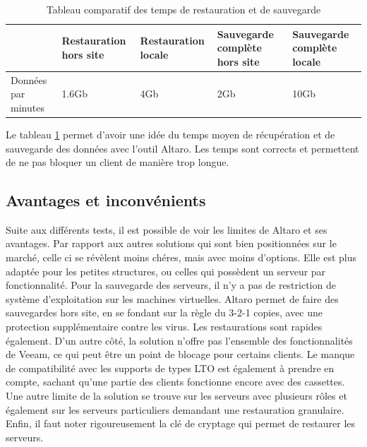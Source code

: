 \documentclass[pfe]{tnreport} %
\begin{document}
\begin{table}[!h]
 \centering
 \begin{tabular}{|p{4cm}|p{2.5cm}|p{2.5cm}|p{2.5cm}|p{2.5cm}|}
 \hline & Restauration hors site & Restauration locale & Sauvegarde complète hors site & Sauvegarde complète locale\\
 \hline Données par minutes & 1.6Gb & 4Gb & 2Gb & 10Gb \\
 \hline 
 \end{tabular}
 \caption{Tableau comparatif des temps de restauration et de sauvegarde}
 \label{tab:temps}
\end{table}
Le tableau \ref{tab:temps} permet d'avoir une idée du temps moyen de récupération et de sauvegarde des données avec l'outil Altaro. Les temps sont corrects et permettent de ne pas bloquer un client de manière trop longue. \newline

\subsection{Avantages et inconvénients}

Suite aux différents tests, il est possible de voir les limites de Altaro et ses avantages.
Par rapport aux autres solutions qui sont bien positionnées sur le marché, celle ci se révèlent moins chéres, mais avec moins d'options. \newline
Elle est plus adaptée pour les petites structures, ou celles qui possèdent un serveur par fonctionnalité. Pour la sauvegarde des serveurs, il n'y a pas de restriction de système d'exploitation sur les machines virtuelles.
Altaro permet de faire des sauvegardes hors site, en se fondant sur la règle du 3-2-1 copies, avec une protection supplémentaire contre les virus. Les restaurations sont rapides également. \newline
D'un autre côté, la solution n'offre pas l'ensemble des fonctionnalités de Veeam, ce qui peut être un point de blocage pour certains clients. \newline 
Le manque de compatibilité avec les supports de types LTO est également à prendre en compte, sachant qu'une partie des clients fonctionne encore avec des cassettes. \newline
Une autre limite de la solution se trouve sur les serveurs avec plusieurs rôles et également sur les serveurs particuliers demandant une restauration granulaire. \newline
Enfin, il faut noter rigoureusement la clé de cryptage qui permet de restaurer les serveurs. \newline
\end{document}
